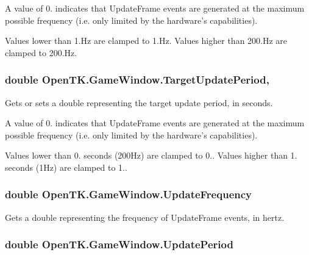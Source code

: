 A value of 0. indicates that Update\-Frame events are generated at the maximum possible frequency (i.\-e. only limited by the hardware's capabilities).

Values lower than 1.\-Hz are clamped to 1.\-Hz. Values higher than 200.\-Hz are clamped to 200.\-Hz.\hypertarget{class_open_t_k_1_1_game_window_a3fb751962cfcd5c95ad4b9fb84f40dbb}{
\subsubsection[{Target\-Update\-Period}]{\setlength{\rightskip}{0pt plus 5cm}double Open\-T\-K.\-Game\-Window.\-Target\-Update\-Period\hspace{0.3cm}{\ttfamily [get]}, {\ttfamily [set]}}}\label{class_open_t_k_1_1_game_window_a3fb751962cfcd5c95ad4b9fb84f40dbb}


Gets or sets a double representing the target update period, in seconds. 

A value of 0. indicates that Update\-Frame events are generated at the maximum possible frequency (i.\-e. only limited by the hardware's capabilities).

Values lower than 0. seconds (200\-Hz) are clamped to 0.. Values higher than 1. seconds (1\-Hz) are clamped to 1..\hypertarget{class_open_t_k_1_1_game_window_aeee75eb97d0c305788b802a09fac3540}{
\subsubsection[{Update\-Frequency}]{\setlength{\rightskip}{0pt plus 5cm}double Open\-T\-K.\-Game\-Window.\-Update\-Frequency\hspace{0.3cm}{\ttfamily [get]}}}\label{class_open_t_k_1_1_game_window_aeee75eb97d0c305788b802a09fac3540}


Gets a double representing the frequency of Update\-Frame events, in hertz. 

\hypertarget{class_open_t_k_1_1_game_window_a1a44982a760d216e014c79dbf472f779}{
\subsubsection[{Update\-Period}]{\setlength{\rightskip}{0pt plus 5cm}double Open\-T\-K.\-Game\-Window.\-Update\-Period\hspace{0.3cm}{\ttfamily [get]}}}\label{class_open_t_k_1_1_game_window_a1a44982a760d216e014c79dbf472f779}


